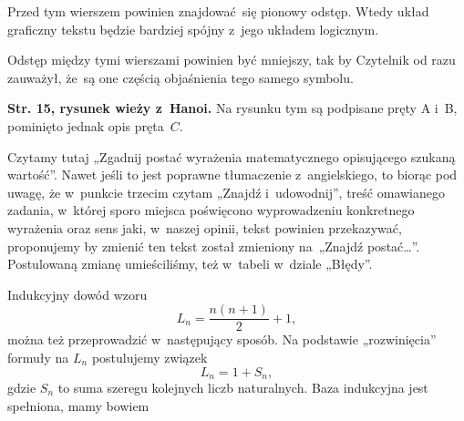 \documentclass[a4paper,11pt]{article}
\numberwithin{equation}{section}
\begin{document}

\vspace{0em}


\noindent
{} Przed tym wierszem powinien znajdować~się pionowy
odstęp. Wtedy układ graficzny tekstu będzie bardziej spójny z~jego układem
logicznym.

\VerSpaceFour





\noindent
{} Odstęp między tymi wierszami powinien być
mniejszy, tak by Czytelnik od razu zauważył, że~są one częścią objaśnienia
tego samego symbolu.

\VerSpaceFour





\noindent
\textbf{Str. 15, rysunek wieży z~Hanoi.} Na rysunku tym są podpisane
pręty A i~B, pominięto jednak opis pręta~$C$.

\VerSpaceFour





\noindent
{} Czytamy tutaj „Zgadnij postać wyrażenia matematycznego
opisującego szukaną wartość”. Nawet jeśli to jest poprawne tłumaczenie
z~angielskiego, to biorąc pod uwagę, że w~punkcie trzecim czytam „Znajdź
i~udowodnij”, treść omawianego zadania, w~której sporo miejsca poświęcono
wyprowadzeniu konkretnego wyrażenia oraz sens jaki, w~naszej opinii, tekst
powinien przekazywać, proponujemy by zmienić ten tekst został zmieniony
na~„Znajdź postać\ldots”. Postulowaną zmianę umieściliśmy, też w~tabeli w~dziale
„Błędy”.

\VerSpaceFour





\noindent
{} Indukcyjny dowód wzoru
\begin{equation}
  \label{eq:1111}
  L_{ n } = \frac{ n ( n + 1 ) }{ 2 } + 1,
\end{equation}
można też przeprowadzić w~następujący sposób. Na podstawie „rozwinięcia”
formuły na $L_{ n }$ postulujemy związek
\begin{equation}
  \label{eq:1113}
  L_{ n } = 1 + S_{ n },
\end{equation}
gdzie $S_{ n }$ to suma szeregu kolejnych liczb naturalnych. Baza indukcyjna
jest spełniona, mamy bowiem

\negVerSpaceFive
\end{document}

